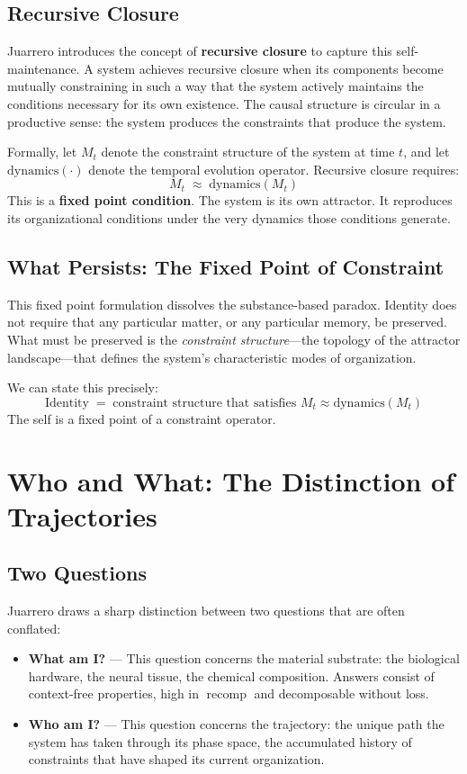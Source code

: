 \documentclass[11pt]{article}
\newcommand{\recomp}{\operatorname{recomp}}
\begin{document}
\subsection{Recursive Closure}

Juarrero introduces the concept of \textbf{recursive closure} to capture this
self-maintenance. A system achieves recursive closure when its components become mutually
constraining in such a way that the system actively maintains the conditions necessary for
its own existence. The causal structure is circular in a productive sense: the system
produces the constraints that produce the system.

Formally, let $M_t$ denote the constraint structure of the system at time $t$, and let
$\mathrm{dynamics}(\cdot)$ denote the temporal evolution operator. Recursive closure
requires:
\[
M_t \;\approx\; \mathrm{dynamics}(M_t)
\]
This is a \textbf{fixed point condition}. The system is its own attractor. It reproduces
its organizational conditions under the very dynamics those conditions generate.

\subsection{What Persists: The Fixed Point of Constraint}

This fixed point formulation dissolves the substance-based paradox. Identity does not
require that any particular matter, or any particular memory, be preserved. What must be
preserved is the \emph{constraint structure}—the topology of the attractor landscape—that
defines the system's characteristic modes of organization.

We can state this precisely:
\[
\text{Identity} \;=\; \text{constraint structure that satisfies } M_t \approx \mathrm{dynamics}(M_t)
\]
The self is a fixed point of a constraint operator.

\section{Who and What: The Distinction of Trajectories}

\subsection{Two Questions}

Juarrero draws a sharp distinction between two questions that are often conflated:

\begin{itemize}
  \item \textbf{What am I?} — This question concerns the material substrate: the
        biological hardware, the neural tissue, the chemical composition. Answers consist
        of context-free properties, high in $\recomp$ and decomposable without loss.
  \item \textbf{Who am I?} — This question concerns the trajectory: the unique path the
        system has taken through its phase space, the accumulated history of constraints
        that have shaped its current organization.
\end{itemize}
\end{document}
